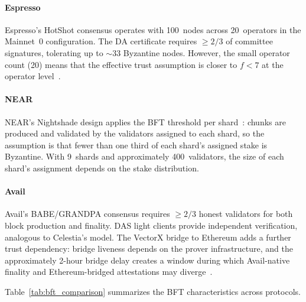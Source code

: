 \paragraph{Espresso}
Espresso's HotShot consensus operates with 100~nodes across 20~operators in the Mainnet~0 configuration.
The DA certificate requires $\geq 2/3$ of committee signatures, tolerating up to $\sim$33 Byzantine nodes.
However, the small operator count (20) means that the effective trust assumption is closer to $f < 7$ at the operator level~\cite{Espresso:Hotshot_and_Triamisu}.

\paragraph{NEAR}
NEAR's Nightshade design applies the BFT threshold per shard~\cite{NEAR_Nightshade_Scaling_Blockchain}: chunks are produced and validated by the validators assigned to each shard, so the assumption is that fewer than one third of each shard's assigned stake is Byzantine.
With 9~shards and approximately 400~validators, the size of each shard's assignment depends on the stake distribution.

\paragraph{Avail}
Avail's BABE/GRANDPA consensus requires $\geq 2/3$ honest validators for both block production and finality.
DAS light clients provide independent verification, analogous to Celestia's model.
The VectorX bridge to Ethereum adds a further trust dependency: bridge liveness depends on the prover infrastructure, and the approximately 2-hour bridge delay creates a window during which Avail-native finality and Ethereum-bridged attestations may diverge~\cite{Avail_The_DA_Blockchain}.

Table~\ref{tab:bft_comparison} summarizes the BFT characteristics across protocols.

